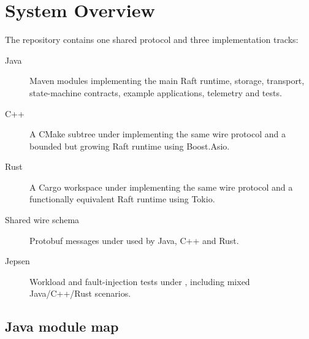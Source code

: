 \section{System Overview}
\label{sec:SystemOverview}

The repository contains one shared protocol and three implementation tracks:

\begin{description}
\item[Java] Maven modules implementing the main Raft runtime, storage, transport,
state-machine contracts, example applications, telemetry and tests.
\item[C++] A CMake subtree under  implementing the same wire
protocol and a bounded but growing Raft runtime using Boost.Asio.
\item[Rust] A Cargo workspace under  implementing the same
wire protocol and a functionally equivalent Raft runtime using Tokio.
\item[Shared wire schema] Protobuf messages under 
used by Java, C++ and Rust.
\item[Jepsen] Workload and fault-injection tests under , including
mixed Java/C++/Rust scenarios.
\end{description}

\subsection{Java module map}

